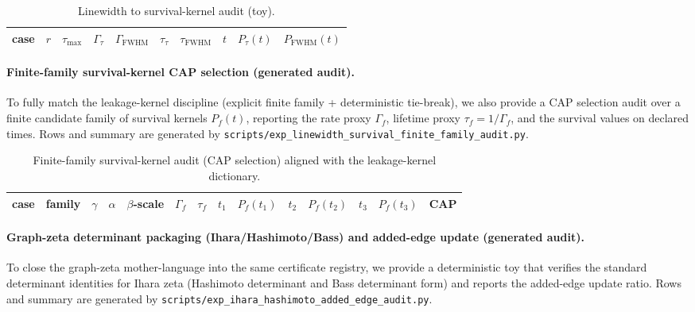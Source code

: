 \begin{table}[t]
\centering
\scriptsize
\setlength{\tabcolsep}{6pt}
\renewcommand{\arraystretch}{1.15}
\begin{tabular}{l r r r r r r r r r}
\toprule
case & $r$ & $\tau_{\max}$ & $\Gamma_{\tau}$ & $\Gamma_{\mathrm{FWHM}}$ & $\tau_{\tau}$ & $\tau_{\mathrm{FWHM}}$ & $t$ & $P_{\tau}(t)$ & $P_{\mathrm{FWHM}}(t)$ \\
\midrule

\end{tabular}
\caption{Linewidth to survival-kernel audit (toy).}
\label{tab:linewidth_survival_kernel_audit}
\end{table}

%

\paragraph{Finite-family survival-kernel CAP selection (generated audit).}
\AuditTag To fully match the leakage-kernel discipline (explicit finite family + deterministic tie-break),
we also provide a CAP selection audit over a finite candidate family of survival kernels $P_f(t)$,
reporting the rate proxy $\Gamma_f$, lifetime proxy $\tau_f=1/\Gamma_f$, and the survival values on declared times.
Rows and summary are generated by \texttt{scripts/exp\_linewidth\_survival\_finite\_family\_audit.py}.

\begin{table}[t]
\centering
\scriptsize
\setlength{\tabcolsep}{6pt}
\renewcommand{\arraystretch}{1.15}
\begin{tabular}{l l r r r r r r r r r r r l}
\toprule
case & family & $\gamma$ & $\alpha$ & $\beta$-scale & $\Gamma_f$ & $\tau_f$ & $t_1$ & $P_f(t_1)$ & $t_2$ & $P_f(t_2)$ & $t_3$ & $P_f(t_3)$ & CAP \\
\midrule

\end{tabular}
\caption{Finite-family survival-kernel audit (CAP selection) aligned with the leakage-kernel dictionary.}
\label{tab:survival_finite_family_audit}
\end{table}

%

\paragraph{Graph-zeta determinant packaging (Ihara/Hashimoto/Bass) and added-edge update (generated audit).}
\AuditTag To close the graph-zeta mother-language into the same certificate registry, we provide a deterministic toy that verifies
the standard determinant identities for Ihara zeta (Hashimoto determinant and Bass determinant form) and reports the added-edge update ratio.
Rows and summary are generated by \texttt{scripts/exp\_ihara\_hashimoto\_added\_edge\_audit.py}.

